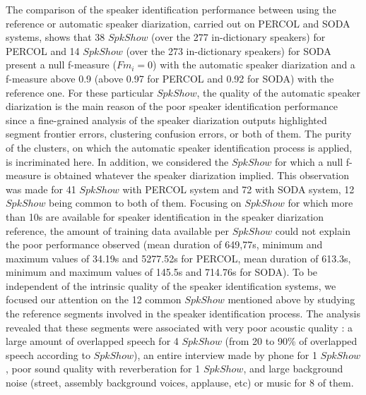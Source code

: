The comparison of the speaker identification performance between using the reference or automatic speaker diarization, carried out on PERCOL and SODA systems, shows that 38 $SpkShow$ (over the 277 in-dictionary speakers) for PERCOL and 14 $SpkShow$ (over the 273 in-dictionary speakers) for SODA present a null f-measure ($Fm_i=0$) with the automatic speaker diarization and a f-measure above 0.9 (above 0.97 for PERCOL and 0.92 for SODA) with the reference one. For these particular $SpkShow$, the quality of the automatic speaker diarization is the main reason of the poor speaker identification performance since a fine-grained analysis of the speaker diarization outputs highlighted segment frontier errors, clustering confusion errors, or both of them. The purity of the clusters, on which the automatic speaker identification process is applied, is incriminated here. 
In addition, we considered the $SpkShow$ for which a null f-measure is obtained whatever the speaker diarization implied. This observation was made for 41 $SpkShow$ with PERCOL system and 72 with SODA system, 12 $SpkShow$ being common to both of them. Focusing on $SpkShow$ for which more than 10s are available for speaker identification in the speaker diarization reference, the amount of training data available per $SpkShow$  could not explain the poor performance observed (mean duration of 649,77s, minimum and maximum values of 34.19s and 5277.52s for PERCOL, mean duration of 613.3s, minimum and maximum values of 145.5s and 714.76s for SODA). 
To be independent of the intrinsic quality of the speaker identification systems, we focused our attention on the 12 common $SpkShow$ mentioned above by studying the reference segments involved in the speaker identification process. The analysis revealed that these segments were associated with very poor acoustic quality : a large amount of overlapped speech for 4 $SpkShow$ (from 20 to 90\% of overlapped speech according to  $SpkShow$), an entire interview made by phone for 1 $SpkShow$, poor sound quality with reverberation for 1 $SpkShow$, and large background noise (street, assembly background voices, applause, etc) or music for 8 of them.

